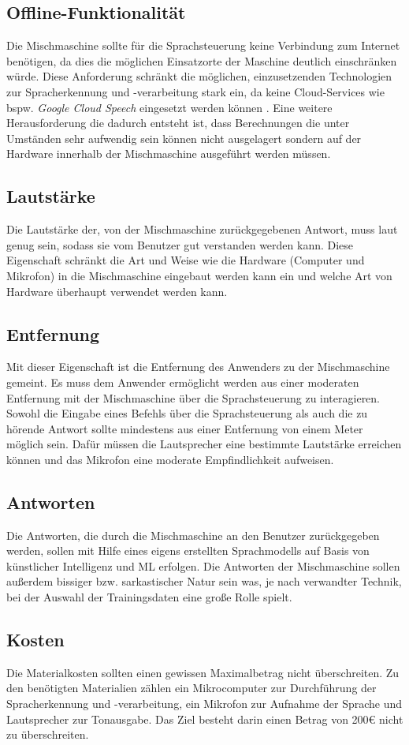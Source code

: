 \subsection{Offline-Funktionalität}
Die Mischmaschine sollte für die Sprachsteuerung keine Verbindung zum Internet benötigen, da dies die möglichen Einsatzorte der Maschine deutlich einschränken würde.  Diese Anforderung schränkt die möglichen, einzusetzenden Technologien zur Spracherkennung und -verarbeitung stark ein, da keine Cloud-Services wie bspw. \textit{Google Cloud Speech} eingesetzt werden können \cite{google_cloud_speech}. Eine weitere Herausforderung die dadurch entsteht ist, dass Berechnungen die unter Umständen sehr aufwendig sein können nicht ausgelagert sondern auf der Hardware innerhalb der Mischmaschine ausgeführt werden müssen.
\subsection{Lautstärke}
Die Lautstärke der, von der Mischmaschine zurückgegebenen Antwort, muss laut genug sein, sodass sie vom Benutzer gut verstanden werden kann. Diese Eigenschaft schränkt die Art und Weise wie die Hardware (Computer und Mikrofon) in die Mischmaschine eingebaut werden kann ein und welche Art von Hardware überhaupt verwendet werden kann.
\subsection{Entfernung}
Mit dieser Eigenschaft ist die Entfernung des Anwenders zu der Mischmaschine gemeint. Es muss dem Anwender ermöglicht werden aus einer moderaten Entfernung mit der Mischmaschine über die Sprachsteuerung zu interagieren. Sowohl die Eingabe eines Befehls über die Sprachsteuerung als auch die zu hörende Antwort sollte mindestens aus einer Entfernung von einem Meter möglich sein. Dafür müssen die Lautsprecher eine bestimmte Lautstärke erreichen können und das Mikrofon eine moderate Empfindlichkeit aufweisen.
\subsection{Antworten}
Die Antworten, die durch die Mischmaschine an den Benutzer zurückgegeben werden, sollen mit Hilfe eines eigens erstellten Sprachmodells auf Basis von künstlicher Intelligenz und \ac{ML} erfolgen. Die Antworten der Mischmaschine sollen außerdem bissiger bzw. sarkastischer Natur sein was, je nach verwandter Technik, bei der Auswahl der Trainingsdaten eine große Rolle spielt.  
\subsection{Kosten}
Die Materialkosten sollten einen gewissen Maximalbetrag nicht überschreiten. Zu den benötigten Materialien zählen ein Mikrocomputer zur Durchführung der Spracherkennung und -verarbeitung, ein Mikrofon zur Aufnahme der Sprache und Lautsprecher zur Tonausgabe. Das Ziel besteht darin einen Betrag von 200€ nicht zu überschreiten.
